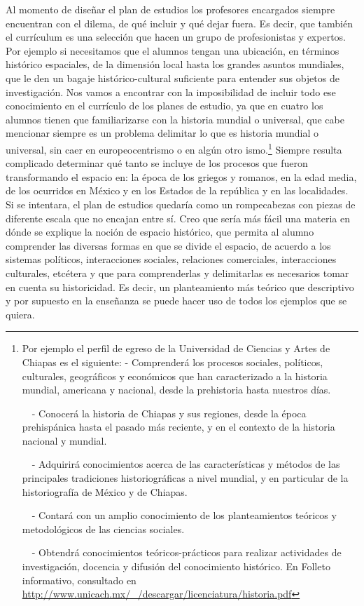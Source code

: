 Al momento de diseñar el plan de estudios los profesores encargados 
siempre encuentran con el dilema, de qué incluir y qué dejar fuera. Es 
decir, que también el currículum es una selección que hacen un grupo de 
profesionistas y expertos. Por ejemplo si necesitamos que el alumnos 
tengan una ubicación, en términos histórico espaciales, de la dimensión 
local hasta los grandes asuntos mundiales, que le den un bagaje 
histórico-cultural suficiente para entender sus objetos de 
investigación. Nos vamos a encontrar con la imposibilidad de incluir 
todo ese conocimiento en el currículo de los planes de estudio, ya que 
en cuatro los alumnos tienen que familiarizarse con la historia mundial 
o universal, que cabe mencionar siempre es un problema delimitar lo que 
es historia mundial o universal, sin caer en europeocentrismo o en 
algún otro ismo.\footnote{ Por ejemplo el perfil de egreso de la 
Universidad de Ciencias y Artes de Chiapas es el siguiente: - 
Comprenderá los procesos sociales, políticos, culturales, geográficos y 
económicos que han caracterizado a la historia mundial, americana y 
nacional, desde la prehistoria hasta nuestros días. \par \ \ - Conocerá 
la historia de Chiapas y sus regiones, desde la época prehispánica 
hasta el pasado más reciente, y en el contexto de la historia nacional 
y mundial. \par \ \ - Adquirirá conocimientos acerca de las 
características y métodos de las principales tradiciones 
historiográficas a nivel mundial, y en particular de la historiografía 
de México y de Chiapas. \par \ \ - Contará con un amplio conocimiento 
de los planteamientos teóricos y metodológicos de las ciencias 
sociales. \par \ \ - Obtendrá conocimientos teóricos-prácticos para 
realizar actividades de investigación, docencia y difusión del 
conocimiento histórico. En Folleto informativo, consultado en 
\url{http://www.unicach.mx/_/descargar/licenciatura/historia.pdf} } 
Siempre resulta complicado determinar qué tanto se incluye de los 
procesos que fueron transformando el espacio en: la época de los 
griegos y romanos, en la edad media, de los ocurridos en México y en 
los Estados de la república y en las localidades. Si se intentara, el 
plan de estudios quedaría como un rompecabezas con piezas de diferente 
escala que no encajan entre sí. Creo que sería más fácil una materia en 
dónde se explique la noción de espacio histórico, que permita al alumno 
comprender las diversas formas en que se divide el espacio, de acuerdo 
a los sistemas políticos, interacciones sociales, relaciones 
comerciales, interacciones culturales, etcétera y que para 
comprenderlas y delimitarlas es necesarios tomar en cuenta su 
historicidad. Es decir, un planteamiento más teórico que descriptivo y 
por supuesto en la enseñanza se puede hacer uso de todos los ejemplos 
que se quiera. 

